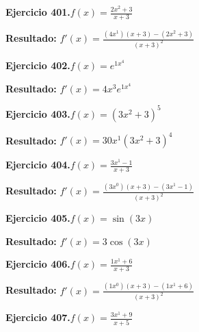 \documentclass[10pt,a4paper]{article}
\begin{document}
\begin{ejbox}
\textbf{Ejercicio 401.}\quad $f(x) = \frac{2x^{2} +3}{x + 3}$
\end{ejbox}

\begin{solbox}
\textbf{Resultado:} \(\displaystyle f'(x) = \frac{(4x^{1})(x+3) - (2x^{2} +3)}{(x+3)^2}\)
\end{solbox}

\begin{ejbox}
\textbf{Ejercicio 402.}\quad $f(x) = e^{1x^{4}}$
\end{ejbox}

\begin{solbox}
\textbf{Resultado:} \(\displaystyle f'(x) = 4x^{3}e^{1x^{4}}\)
\end{solbox}

\newpage
\begin{ejbox}
\textbf{Ejercicio 403.}\quad $f(x) = (3x^{2} +3)^{5}$
\end{ejbox}

\begin{solbox}
\textbf{Resultado:} \(\displaystyle f'(x) = 30x^{1}(3x^{2} +3)^{4}\)
\end{solbox}

\begin{ejbox}
\textbf{Ejercicio 404.}\quad $f(x) = \frac{3x^{1} -1}{x + 3}$
\end{ejbox}

\begin{solbox}
\textbf{Resultado:} \(\displaystyle f'(x) = \frac{(3x^{0})(x+3) - (3x^{1} -1)}{(x+3)^2}\)
\end{solbox}

\begin{ejbox}
\textbf{Ejercicio 405.}\quad $f(x) = \sin(3x)$
\end{ejbox}

\begin{solbox}
\textbf{Resultado:} \(\displaystyle f'(x) = 3\cos(3x)\)
\end{solbox}

\newpage
\begin{ejbox}
\textbf{Ejercicio 406.}\quad $f(x) = \frac{1x^{1} +6}{x + 3}$
\end{ejbox}

\begin{solbox}
\textbf{Resultado:} \(\displaystyle f'(x) = \frac{(1x^{0})(x+3) - (1x^{1} +6)}{(x+3)^2}\)
\end{solbox}

\begin{ejbox}
\textbf{Ejercicio 407.}\quad $f(x) = \frac{3x^{1} +9}{x + 5}$
\end{ejbox}
\end{document}
